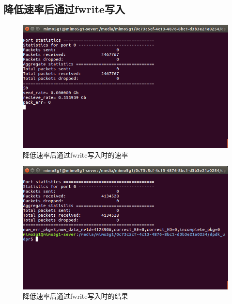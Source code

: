 \documentclass{article}
\begin{document}
\subsection{降低速率后通过fwrite写入}
\begin{figure}[H]
	\centering
	\includegraphics[width = .8\textwidth]{lowrate.png}
	\caption{降低速率后通过fwrite写入时的速率}
\end{figure}
\begin{figure}[H]
	\centering
	\includegraphics[width = .8\textwidth]{lowres.png}
	\caption{降低速率后通过fwrite写入时的结果}
\end{figure}

\end{document}
